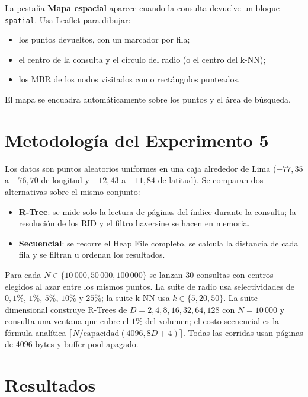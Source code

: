 \documentclass[11pt,a4paper]{article}
\newcommand{\code}[1]{\texttt{#1}}
\begin{document}
La pestaña \textbf{Mapa espacial} aparece cuando la consulta devuelve un bloque
\code{spatial}. Usa Leaflet para dibujar:

\begin{itemize}
  \item los puntos devueltos, con un marcador por fila;
  \item el centro de la consulta y el círculo del radio (o el centro del k-NN);
  \item los MBR de los nodos visitados como rectángulos punteados.
\end{itemize}

El mapa se encuadra automáticamente sobre los puntos y el área de búsqueda.

\section{Metodología del Experimento 5}

Los datos son puntos aleatorios uniformes en una caja alrededor de Lima
(\(-77{,}35\) a \(-76{,}70\) de longitud y \(-12{,}43\) a \(-11{,}84\) de latitud).
Se comparan dos alternativas sobre el mismo conjunto:

\begin{itemize}
  \item \textbf{R-Tree}: se mide solo la lectura de páginas del índice durante la
        consulta; la resolución de los RID y el filtro haversine se hacen en
        memoria.
  \item \textbf{Secuencial}: se recorre el Heap File completo, se calcula la
        distancia de cada fila y se filtran u ordenan los resultados.
\end{itemize}

Para cada \(N \in \{10\,000, 50\,000, 100\,000\}\) se lanzan 30 consultas con
centros elegidos al azar entre los mismos puntos. La suite de radio usa
selectividades de \(0{,}1\%\), \(1\%\), \(5\%\), \(10\%\) y \(25\%\); la suite
k-NN usa \(k \in \{5, 20, 50\}\). La suite dimensional construye R-Trees de
\(D = 2, 4, 8, 16, 32, 64, 128\) con \(N = 10\,000\) y consulta una ventana que
cubre el \(1\%\) del volumen; el costo secuencial es la fórmula analítica
\(\lceil N / \text{capacidad}(4096, 8D+4) \rceil\). Todas las corridas usan
páginas de 4096 bytes y buffer pool apagado.

\section{Resultados}
\end{document}
